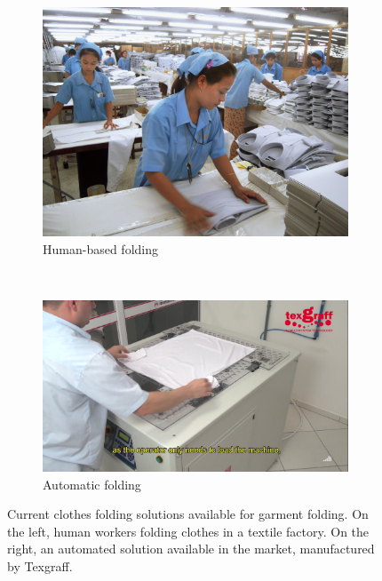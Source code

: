\begin{figure}[htbp]
		\centering
        \begin{subfigure}[l]{0.42\textwidth}
            \centering
    		\includegraphics[width=\textwidth]
    		{figures/Intro_japan_folding.jpg}
			\caption{Human-based folding} %
        \end{subfigure}
        ~
        \begin{subfigure}[r]{0.56\textwidth}
	        \centering
    		\includegraphics[width=\textwidth]
    		{figures/Intro_industrial_folding.png}
		    \caption{Automatic folding}        
		\end{subfigure} 
		\caption[Current clothes folding solutions available for garment folding]{Current clothes folding solutions available for garment folding. On the left, human workers folding clothes in a textile factory\footnotemark. On the right, an automated solution available in the market, manufactured by Texgraff\textcopyright.}
		\label{fig:current_solutions}
\end{figure}



